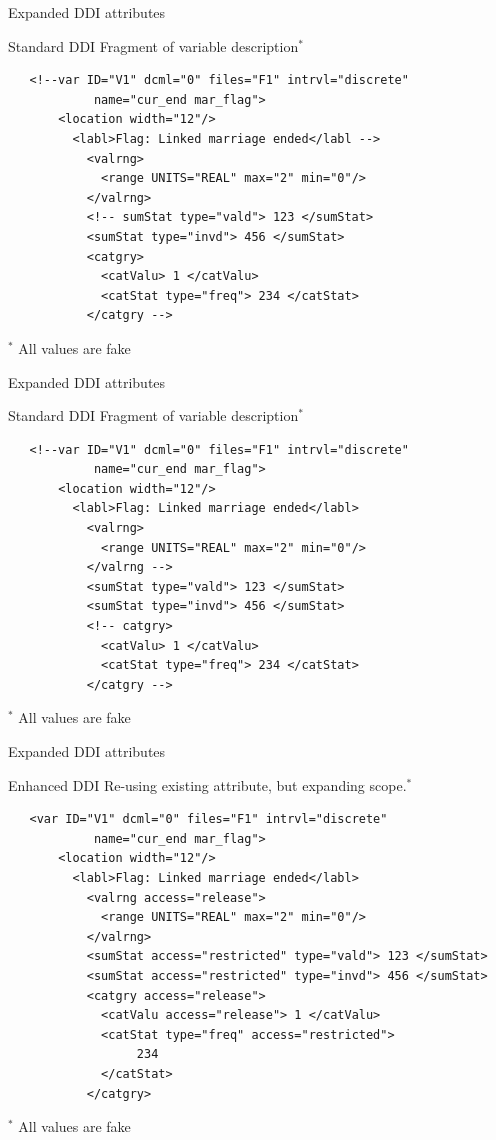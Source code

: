 \begin{frame}[fragile]{Expanded DDI attributes}
\begin{block}{Standard DDI}
Fragment of variable description$^*$
\begin{verbatim}
   <!--var ID="V1" dcml="0" files="F1" intrvl="discrete" 
   			name="cur_end mar_flag">
       <location width="12"/>
         <labl>Flag: Linked marriage ended</labl -->
           <valrng>
             <range UNITS="REAL" max="2" min="0"/>
           </valrng>
           <!-- sumStat type="vald"> 123 </sumStat>
           <sumStat type="invd"> 456 </sumStat>
           <catgry>
             <catValu> 1 </catValu>
             <catStat type="freq"> 234 </catStat>
           </catgry -->
\end{verbatim}
\end{block}
\tiny{$^*$ All values are fake}
\end{frame}

\begin{frame}[fragile]{Expanded DDI attributes}
\begin{block}{Standard DDI}
Fragment of variable description$^*$
\begin{verbatim}
   <!--var ID="V1" dcml="0" files="F1" intrvl="discrete" 
   			name="cur_end mar_flag">
       <location width="12"/>
         <labl>Flag: Linked marriage ended</labl>
           <valrng>
             <range UNITS="REAL" max="2" min="0"/>
           </valrng -->
           <sumStat type="vald"> 123 </sumStat>
           <sumStat type="invd"> 456 </sumStat>
           <!-- catgry>
             <catValu> 1 </catValu>
             <catStat type="freq"> 234 </catStat>
           </catgry -->
\end{verbatim}
\end{block}
\tiny{$^*$ All values are fake}
\end{frame}



\begin{frame}[fragile]{Expanded DDI attributes}

\begin{block}{Enhanced DDI}
Re-using existing attribute, but expanding scope.$^*$
\begin{verbatim}
   <var ID="V1" dcml="0" files="F1" intrvl="discrete" 
   			name="cur_end mar_flag">
       <location width="12"/>
         <labl>Flag: Linked marriage ended</labl>
           <valrng access="release">
             <range UNITS="REAL" max="2" min="0"/>
           </valrng>
           <sumStat access="restricted" type="vald"> 123 </sumStat>
           <sumStat access="restricted" type="invd"> 456 </sumStat>
           <catgry access="release">
             <catValu access="release"> 1 </catValu>
             <catStat type="freq" access="restricted"> 
                  234
             </catStat>
           </catgry>
\end{verbatim}
\end{block}
\tiny{$^*$ All values are fake}
\end{frame}


